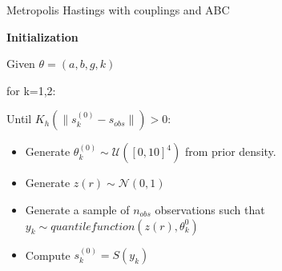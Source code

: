 \documentclass{beamer}
\begin{document}
\begin{frame}{Metropolis Hastings with couplings and ABC}


	\begin{block}{}
		\begin{center}
			\textbf{Initialization} 
		\end{center}
	\end{block}	
	Given $\theta =( a,b,g,k )$
	
	for k=1,2:
	
	 Until $K_h(\|s_{k}^{(0)} - s_{obs}\|)>0$:
		\begin{itemize}
			\item Generate $\theta_{k}^{(0)} \sim \mathcal{U}([0,10]^4)$ from prior density.
			\item Generate $z(r) \sim \mathcal{N}(0,1)$
			\item Generate a sample of $n_{obs}$ observations such that $y_{k} \sim quantile function(z(r),\theta_{k}^{0})$
			\item Compute $s_{k}^{(0)}=S(y_{k})$
			
		\end{itemize}

	

		
		\end{frame}
\end{document}
